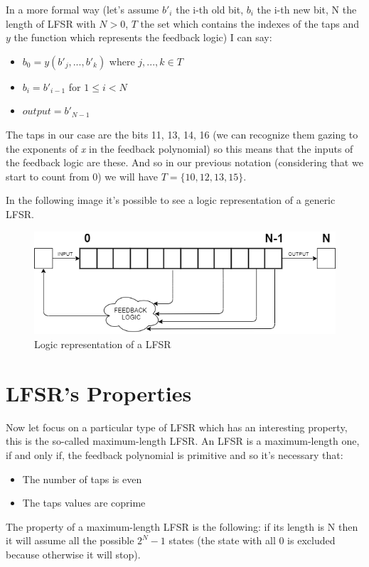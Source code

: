 \documentclass[a4paper]{report}
\begin{document}
\noindent In a more formal way (let's assume $b'_i$ the i-th old bit, $b_i$ the i-th new bit, N the length of LFSR with $N>0$, $T$ the set which contains the indexes of the taps and $y$ the function which represents the feedback logic) I can say:
\begin{itemize}
	\item $b_0 = y(b'_j, ..., b'_k)$ where  $j, ..., k \in T$
	\item $b_i = b'_{i-1}$  for $1\leq i<N$
	\item $output = b'_{N-1}$
\end{itemize}

\noindent The taps in our case are the bits 11, 13, 14, 16 (we can recognize them gazing to the exponents of \emph{x} in the feedback polynomial) so this means that the inputs of the feedback logic are these. And so in our previous notation (considering that we start to count from 0) we will have $T=\{10, 12, 13, 15\}$.

\noindent In the following image it's possible to see a logic representation of a generic LFSR.
\begin{figure}[htbp]
	\centering
	\includegraphics[scale=0.5]{img/LFSR-functionality.png}
	\caption{Logic representation of a LFSR}
\end{figure}
\section{LFSR's Properties}
Now let focus on a particular type of LFSR which has an interesting property, this is the so-called maximum-length LFSR. An LFSR is a maximum-length one, if and only if, the feedback polynomial is primitive and so it's necessary that:
\begin{itemize}
	\item The number of taps is even
	\item The taps values are coprime
\end{itemize}
The property of a maximum-length LFSR is the following: if its length is N then it will assume all the possible $2^N-1$ states (the state with all 0 is excluded because otherwise it will stop).
\end{document}
